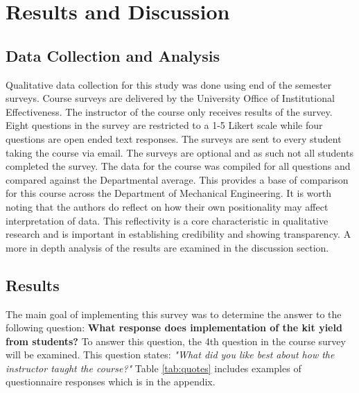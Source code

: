 \section{Results and Discussion}

\subsection{Data Collection and Analysis}

Qualitative data collection for this study was done using end of the
semester surveys. Course surveys are delivered by the University
Office of Institutional Effectiveness. The instructor of the course
only receives results of the survey. Eight questions in the survey are
restricted to a 1-5 Likert scale while four questions are open ended
text responses\cite{likert}. The surveys are sent to every student
taking the course via email. The surveys are optional and as such not
all students completed the survey. The data for the course was
compiled for all questions and compared against the Departmental
average. This provides a base of comparison for this course across the
Department of Mechanical Engineering. It is worth noting that the
authors do reflect on how their own positionality may affect
interpretation of data. This reflectivity is a core characteristic in
qualitative research and is important in establishing credibility and
showing transparency. A more in depth analysis of the results are
examined in the discussion section.  

\subsection{Results}

The main goal of implementing this survey was to determine the answer
to the following question: {\bf What response does implementation of
  the kit yield from students?} To answer this question, the 4th
question in the course survey will be examined. This question states:
{\it "What did you like best about how the instructor taught the
  course?"} Table \ref{tab:quotes} includes examples of questionnaire
responses which is in the appendix.

